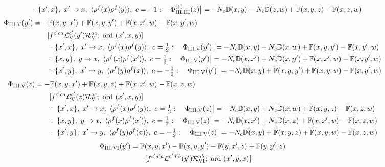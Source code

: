 \documentclass[9pt]{article}
\def\mf#1{\mathbb{#1}}
\numberwithin{equation}{section}
\begin{document}
{\begin{align}
&\qquad\cdot\ \{x',x\},\ x'\to x,\ \langle\rho^{f}(x)\rho^{f}(y)\rangle,\ c=-1:\quad \Phi_{\rm III.III}^{(1)}(z)\big|=-N_{c}\mf{D}(x,y)-N_{c}\mf{D}(z,w)+\mf{F}(x,y,z)+\mf{F}(x,z,w)\notag
\end{align}
\begin{align}
\Phi_{\rm III.V}(y')&=-\mf{F}(x,y,x')+\mf{F}(x,y,y')+\mf{F}(x,x',w)-\mf{F}(x,y',w)\notag\\&\qquad[f^{c'ca}\mathcal{L}_{\rm V}^{c'}(y')\mathcal{R}_{\rm V}^{ac};\ \text{ord}\ (x',x,y)]\notag\\
&\qquad\cdot\ \{x',x\},\ x'\to x,\ \langle\rho^{f}(x)\rho^{f}(y)\rangle,\ c=\tfrac{1}{2}:\quad \Phi_{\rm III.V}(y')\big|=-N_{c}\mf{D}(x,y)+N_{c}\mf{D}(x,w)+\mf{F}(x,y,y')-\mf{F}(x,y',w)\notag\\
&\qquad\cdot\ \{x,y\},\ y\to x,\ \langle\rho^{f}(x)\rho^{f}(x')\rangle,\ c=\tfrac{1}{2}:\quad \Phi_{\rm III.V}(y')\big|=-N_{c}\mf{D}(x,x')+N_{c}\mf{D}(x,y')+\mf{F}(x,x',w)-\mf{F}(x,y',w)\notag\\
&\qquad\cdot\ \{x',y\},\ x'\to y,\ \langle\rho^{f}(y)\rho^{f}(x)\rangle,\ c=-\tfrac{1}{2}:\quad \Phi_{\rm III.V}(y')\big|=-N_{c}\mf{D}(x,y)+\mf{F}(x,y,y')+\mf{F}(x,y,w)-\mf{F}(x,y',w)\notag
\end{align}
\begin{align}
\Phi_{\rm III.V}(z)&=-\mf{F}(x,y,x')+\mf{F}(x,y,z)+\mf{F}(x,x',w)-\mf{F}(x,z,w)\notag\\&\qquad[f^{c'ca}\mathcal{L}_{\rm V}^{c'}(z)\mathcal{R}_{\rm V}^{ac};\ \text{ord}\ (x',x,y)]\notag\\
&\qquad\cdot\ \{x',x\},\ x'\to x,\ \langle\rho^{f}(x)\rho^{f}(y)\rangle,\ c=\tfrac{1}{2}:\quad \Phi_{\rm III.V}(z)\big|=-N_{c}\mf{D}(x,y)+N_{c}\mf{D}(x,w)+\mf{F}(x,y,z)-\mf{F}(x,z,w)\notag\\
&\qquad\cdot\ \{x,y\},\ y\to x,\ \langle\rho^{f}(x)\rho^{f}(x')\rangle,\ c=\tfrac{1}{2}:\quad \Phi_{\rm III.V}(z)\big|=-N_{c}\mf{D}(x,x')+N_{c}\mf{D}(x,z)+\mf{F}(x,x',w)-\mf{F}(x,z,w)\notag\\
&\qquad\cdot\ \{x',y\},\ x'\to y,\ \langle\rho^{f}(y)\rho^{f}(x)\rangle,\ c=-\tfrac{1}{2}:\quad \Phi_{\rm III.V}(z)\big|=-N_{c}\mf{D}(x,y)+\mf{F}(x,y,z)+\mf{F}(x,y,w)-\mf{F}(x,z,w)\notag
\end{align}
\begin{align}
\Phi_{\rm III.VI}(y')&=\mf{F}(x,y,x')-\mf{F}(x,y,y')-\mf{F}(y,x',z)+\mf{F}(y,y',z)\notag\\&\qquad[f^{c'd'a}\mathcal{L}^{c'd'b}(y')\mathcal{R}_{\rm VI}^{ab};\ \text{ord}\ (x',y,x)]\notag\\

\end{align}}
\end{document}
